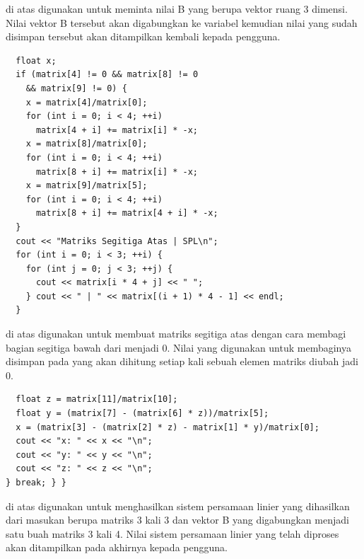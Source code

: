 \documentclass[../main.tex]{subfiles}
\begin{document}
{\Script} di atas digunakan untuk meminta nilai B yang berupa vektor ruang 3 dimensi. Nilai vektor B tersebut akan digabungkan ke variabel {\sarray}  kemudian nilai yang sudah disimpan tersebut akan ditampilkan kembali kepada pengguna.

\begin{code}
\begin{verbatim}
  float x;
  if (matrix[4] != 0 && matrix[8] != 0
    && matrix[9] != 0) {
    x = matrix[4]/matrix[0];
    for (int i = 0; i < 4; ++i)
      matrix[4 + i] += matrix[i] * -x;
    x = matrix[8]/matrix[0];
    for (int i = 0; i < 4; ++i)
      matrix[8 + i] += matrix[i] * -x;
    x = matrix[9]/matrix[5];
    for (int i = 0; i < 4; ++i)
      matrix[8 + i] += matrix[4 + i] * -x;
  }
  cout << "Matriks Segitiga Atas | SPL\n";
  for (int i = 0; i < 3; ++i) {
    for (int j = 0; j < 3; ++j) {
      cout << matrix[i * 4 + j] << " ";
    } cout << " | " << matrix[(i + 1) * 4 - 1] << endl;
  }
\end{verbatim}
\end{code}

{\Script} di atas digunakan untuk membuat matriks segitiga atas dengan cara membagi bagian segitiga bawah dari  menjadi 0. Nilai yang digunakan untuk membaginya disimpan pada  yang akan dihitung setiap kali sebuah elemen matriks diubah jadi 0.

\begin{code}
\begin{verbatim}
  float z = matrix[11]/matrix[10];
  float y = (matrix[7] - (matrix[6] * z))/matrix[5];
  x = (matrix[3] - (matrix[2] * z) - matrix[1] * y)/matrix[0];
  cout << "x: " << x << "\n";
  cout << "y: " << y << "\n";
  cout << "z: " << z << "\n";
} break; } }
\end{verbatim}
\end{code}

{\Script} di atas digunakan untuk menghasilkan sistem persamaan linier yang dihasilkan dari masukan berupa matriks 3 kali 3 dan vektor B yang digabungkan menjadi satu buah matriks 3 kali 4. Nilai sistem persamaan linier yang telah diproses akan ditampilkan pada akhirnya kepada pengguna.
\end{document}
